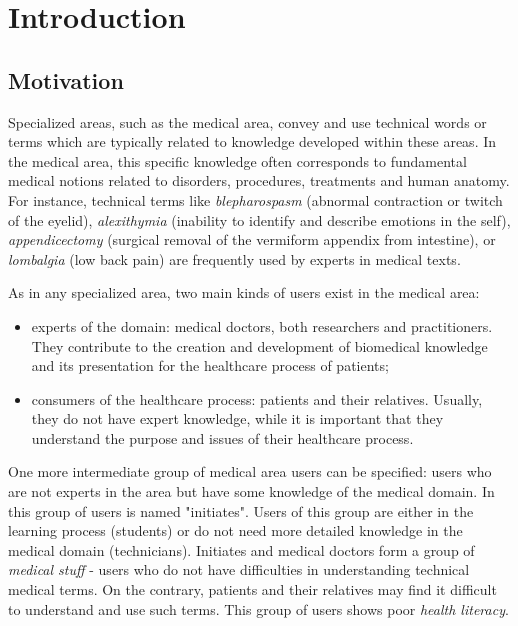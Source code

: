 \chapter{Introduction}

\section{Motivation}
Specialized areas, such as the medical area, convey and use technical words or terms which are typically related to knowledge developed within these areas. In the medical area, this specific knowledge often corresponds to fundamental medical notions related to disorders, procedures, treatments and human anatomy. For instance, technical terms like \textit{blepharospasm} (abnormal contraction or twitch of the eyelid), \textit{alexithymia} (inability to identify and describe emotions in the self), \textit{appendicectomy} (surgical removal of the vermiform appendix from intestine), or \textit{lombalgia} (low back pain) are frequently used by experts in medical texts.

As in any specialized area, two main kinds of users exist in the medical area:

\begin{itemize}
    \item experts of the domain: medical doctors, both researchers and practitioners. They contribute to the creation and development of biomedical knowledge and its presentation for the healthcare process of patients;
    
    \item consumers of the healthcare process: patients and their relatives. Usually, they do not have expert knowledge, while it is important that they understand the purpose and issues of their healthcare process. 
\end{itemize}
One more intermediate group of medical area users can be specified: users who are not experts in the area but have some knowledge of the medical domain. In  \citep{Pearson98} this group of users is named "initiates". Users of this group are either in the learning process (students) or do not need more detailed knowledge in the medical domain (technicians). Initiates and medical doctors form a group of \textit{medical stuff} - users who do not have difficulties in understanding technical medical terms. On the contrary, patients and their relatives may find it difficult to understand and use such terms. This group of users shows poor \textit{health literacy}. 

